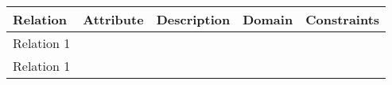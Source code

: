 \begin{longtable}{|p{}|p{} |p{}|p{}|p{} |} 
\hline
\textbf{Relation} & \textbf{Attribute} & \textbf{Description} & \textbf{Domain} & \textbf{Constraints} \\\hline


\multirow{4}{*}{Relation 1} & & & & \\\cline{2-5}
& & & & \\\cline{2-5}
& & & & \\\cline{2-5}
& & & & \\\hline

\multirow{2}{*}{Relation 1} & & & & \\\cline{2-5}
& & & & \\\hline

\end{longtable}
